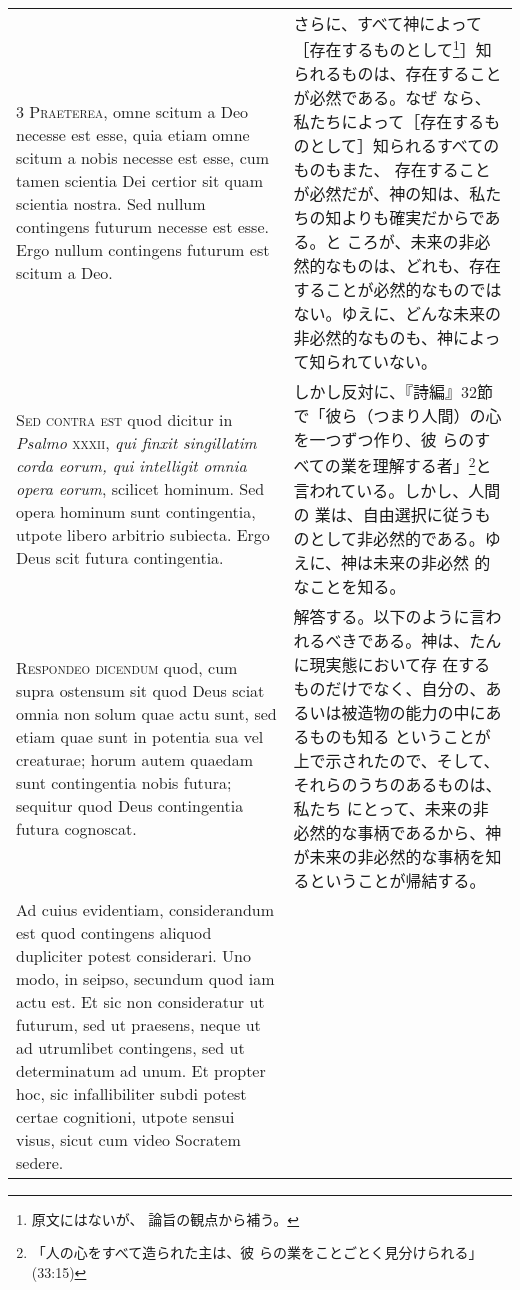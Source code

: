 \documentclass[10pt]{jsarticle} %
\begin{document}
\begin{longtable}{p{21em}p{21em}}
\\


3 {\scshape Praeterea}, omne scitum a Deo necesse est esse, quia etiam
omne scitum a nobis necesse est esse, cum tamen scientia Dei certior
sit quam scientia nostra. Sed nullum contingens futurum necesse est
esse. Ergo nullum contingens futurum est scitum a Deo.

&

さらに、すべて神によって［存在するものとして\footnote{原文にはないが、
論旨の観点から補う。}］知られるものは、存在することが必然である。なぜ
なら、私たちによって［存在するものとして］知られるすべてのものもまた、
存在することが必然だが、神の知は、私たちの知よりも確実だからである。と
ころが、未来の非必然的なものは、どれも、存在することが必然的なものでは
ない。ゆえに、どんな未来の非必然的なものも、神によって知られていない。

\\


{\scshape Sed contra est} quod dicitur in {\itshape Psalmo} {\scshape
xxxii}, {\itshape qui finxit singillatim corda eorum, qui intelligit
omnia opera eorum}, scilicet hominum. Sed opera hominum sunt
contingentia, utpote libero arbitrio subiecta. Ergo Deus scit futura
contingentia.


&

しかし反対に、『詩編』32節で「彼ら（つまり人間）の心を一つずつ作り、彼
らのすべての業を理解する者」\footnote{「人の心をすべて造られた主は、彼
らの業をことごとく見分けられる」(33:15)}と言われている。しかし、人間の
業は、自由選択に従うものとして非必然的である。ゆえに、神は未来の非必然
的なことを知る。

\\


{\scshape Respondeo dicendum} quod, cum supra ostensum
sit quod Deus sciat omnia non solum quae actu sunt, sed etiam quae sunt
in potentia sua vel creaturae; horum autem quaedam sunt contingentia
nobis futura; sequitur quod Deus contingentia futura cognoscat. 


&

解答する。以下のように言われるべきである。神は、たんに現実態において存
在するものだけでなく、自分の、あるいは被造物の能力の中にあるものも知る
ということが上で示されたので、そして、それらのうちのあるものは、私たち
にとって、未来の非必然的な事柄であるから、神が未来の非必然的な事柄を知
るということが帰結する。

\\


Ad cuius
evidentiam, considerandum est quod contingens aliquod dupliciter potest
considerari. Uno modo, in seipso, secundum quod iam actu est. Et sic non
consideratur ut futurum, sed ut praesens, neque ut ad utrumlibet
contingens, sed ut determinatum ad unum. Et propter hoc, sic
infallibiliter subdi potest certae cognitioni, utpote sensui visus,
sicut cum video Socratem sedere. 


\end{longtable}
\end{document}
